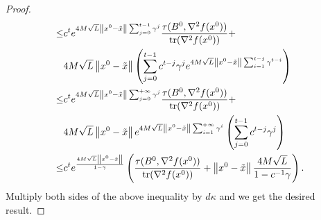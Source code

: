 \documentclass[letterpaper]{article} %
\theoremstyle{plain}
\theoremstyle{definition}
\theoremstyle{remark}
\newcommand\norm[1]{\left\lVert#1\right\rVert}
\begin{document}
\begin{proof}
\begin{align*}
         \leq & c^t e^ {4 M \sqrt{L}  \norm{x^0 - \Tilde{x}} \sum_{j =0}^{t-1}\gamma^{j}} \frac{\tau (B^{0}, \nabla^2 f(x^{0}))}{\mathrm{tr}(\nabla^2 f(x^{0}))} + \\
         & 4 M \sqrt{L}  \norm{x^0 - \Tilde{x}}\left(\sum_{j=0}^{t-1} c^{t-j}\gamma^{j} e^ {4 M \sqrt{L}  \norm{x^0 - \Tilde{x}} \sum_{i=1}^{t-j} \gamma^{t-i}}\right)  \\
         \leq & c^t e^ {4 M \sqrt{L}  \norm{x^0 - \Tilde{x}} \sum_{j =0}^{+ \infty}\gamma^{j}} \frac{\tau (B^{0}, \nabla^2 f(x^{0}))}{\mathrm{tr}(\nabla^2 f(x^{0}))} + \\
         & 4 M \sqrt{L}  \norm{x^0 - \Tilde{x}} e^ {4 M \sqrt{L}  \norm{x^0 - \Tilde{x}} \sum_{i=1}^{+\infty} \gamma^{i}} \left(\sum_{j=0}^{t-1} c^{t-j}\gamma^{j} \right)  \\
         \leq & c^t e^ {\frac{4 M \sqrt{L}  \norm{x^0 - \Tilde{x}}}{1 - \gamma} } \left( \frac{\tau (B^{0}, \nabla^2 f(x^{0}))}{\mathrm{tr}(\nabla^2 f(x^{0}))} + \norm{x^0 - \Tilde{x}} \frac{4 M \sqrt{L}}{1 - c^{-1} \gamma}  \right) . 
    \end{align*}
    Multiply both sides of the above inequality by $d \kappa$ and we get the desired result. 
\end{proof}
\end{document}
